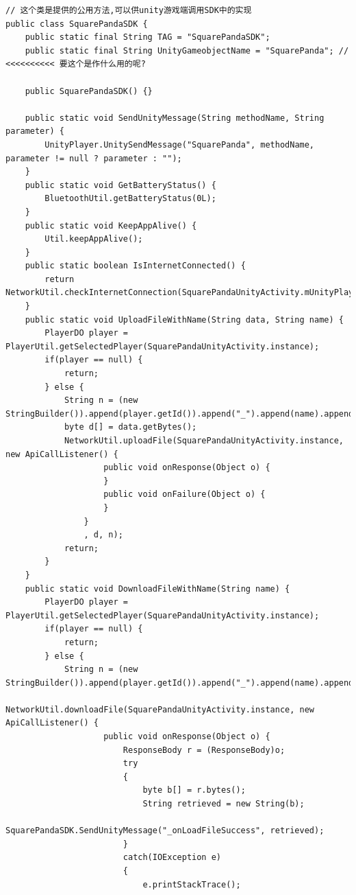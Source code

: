 \documentclass[9pt, b5paper]{article}
\begin{document}
\begin{verbatim}
// 这个类是提供的公用方法,可以供unity游戏端调用SDK中的实现
public class SquarePandaSDK {
    public static final String TAG = "SquarePandaSDK"; 
    public static final String UnityGameobjectName = "SquarePanda"; // <<<<<<<<<< 要这个是作什么用的呢?

    public SquarePandaSDK() {}

    public static void SendUnityMessage(String methodName, String parameter) {
        UnityPlayer.UnitySendMessage("SquarePanda", methodName, parameter != null ? parameter : "");
    }
    public static void GetBatteryStatus() {
        BluetoothUtil.getBatteryStatus(0L);
    }
    public static void KeepAppAlive() {
        Util.keepAppAlive();
    }
    public static boolean IsInternetConnected() {
        return NetworkUtil.checkInternetConnection(SquarePandaUnityActivity.mUnityPlayer.getContext());
    }
    public static void UploadFileWithName(String data, String name) {
        PlayerDO player = PlayerUtil.getSelectedPlayer(SquarePandaUnityActivity.instance);
        if(player == null) {
            return;
        } else {
            String n = (new StringBuilder()).append(player.getId()).append("_").append(name).append(".json").toString();
            byte d[] = data.getBytes();
            NetworkUtil.uploadFile(SquarePandaUnityActivity.instance, new ApiCallListener() {
                    public void onResponse(Object o) {
                    }
                    public void onFailure(Object o) {
                    }
                }
                , d, n);
            return;
        }
    }
    public static void DownloadFileWithName(String name) {
        PlayerDO player = PlayerUtil.getSelectedPlayer(SquarePandaUnityActivity.instance);
        if(player == null) {
            return;
        } else {
            String n = (new StringBuilder()).append(player.getId()).append("_").append(name).append(".json").toString();
            NetworkUtil.downloadFile(SquarePandaUnityActivity.instance, new ApiCallListener() {
                    public void onResponse(Object o) {
                        ResponseBody r = (ResponseBody)o;
                        try
                        {
                            byte b[] = r.bytes();
                            String retrieved = new String(b);
                            SquarePandaSDK.SendUnityMessage("_onLoadFileSuccess", retrieved);
                        }
                        catch(IOException e)
                        {
                            e.printStackTrace();

\end{verbatim}
\end{document}

